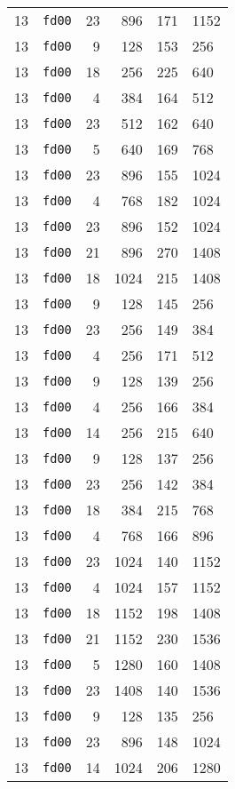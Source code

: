 \documentclass{article}
\begin{document}
\begin{table}[h!]
\begin{tabular}{llrrrl}
    13 & \texttt{fd00} & 23 & 896 & 171 & 1152 \\
    13 & \texttt{fd00} & 9 & 128 & 153 & 256 \\
    13 & \texttt{fd00} & 18 & 256 & 225 & 640 \\
    13 & \texttt{fd00} & 4 & 384 & 164 & 512 \\
    13 & \texttt{fd00} & 23 & 512 & 162 & 640 \\
    13 & \texttt{fd00} & 5 & 640 & 169 & 768 \\
    13 & \texttt{fd00} & 23 & 896 & 155 & 1024 \\
    13 & \texttt{fd00} & 4 & 768 & 182 & 1024 \\
    13 & \texttt{fd00} & 23 & 896 & 152 & 1024 \\
    13 & \texttt{fd00} & 21 & 896 & 270 & 1408 \\
    13 & \texttt{fd00} & 18 & 1024 & 215 & 1408 \\
    13 & \texttt{fd00} & 9 & 128 & 145 & 256 \\
    13 & \texttt{fd00} & 23 & 256 & 149 & 384 \\
    13 & \texttt{fd00} & 4 & 256 & 171 & 512 \\
    13 & \texttt{fd00} & 9 & 128 & 139 & 256 \\
    13 & \texttt{fd00} & 4 & 256 & 166 & 384 \\
    13 & \texttt{fd00} & 14 & 256 & 215 & 640 \\
    13 & \texttt{fd00} & 9 & 128 & 137 & 256 \\
    13 & \texttt{fd00} & 23 & 256 & 142 & 384 \\
    13 & \texttt{fd00} & 18 & 384 & 215 & 768 \\
    13 & \texttt{fd00} & 4 & 768 & 166 & 896 \\
    13 & \texttt{fd00} & 23 & 1024 & 140 & 1152 \\
    13 & \texttt{fd00} & 4 & 1024 & 157 & 1152 \\
    13 & \texttt{fd00} & 18 & 1152 & 198 & 1408 \\
    13 & \texttt{fd00} & 21 & 1152 & 230 & 1536 \\
    13 & \texttt{fd00} & 5 & 1280 & 160 & 1408 \\
    13 & \texttt{fd00} & 23 & 1408 & 140 & 1536 \\
    13 & \texttt{fd00} & 9 & 128 & 135 & 256 \\
    13 & \texttt{fd00} & 23 & 896 & 148 & 1024 \\
    13 & \texttt{fd00} & 14 & 1024 & 206 & 1280 \\

\end{tabular}
\end{table}
\end{document}
